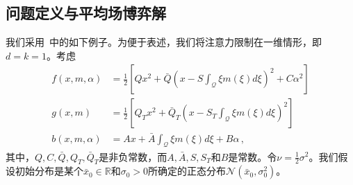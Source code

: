 \documentclass{amsproc}
\theoremstyle{definition}
\theoremstyle{remark}
\numberwithin{equation}{section}
\newcommand{\RR}{{\mathbb R}}
\newcommand{\ctrl}{\alpha}
\newcommand{\ctrldim}{k}
\newcommand{\dom}{\mathcal{Q}}
\begin{document}
\subsection{问题定义与平均场博弈解}
\label{AMS-num-sec:LQ-pb}
我们采用~\cite[Chapter 6]{MR3134900}中的如下例子。为便于表述，我们将注意力限制在一维情形，即$d=\ctrldim=1$。考虑
\begin{align*}
	f(x,m,\ctrl)	&= \frac{1}{2} \left[ Q x^2 + \bar{Q} \left(x - S \int_{\dom} \xi m(\xi) d\xi \right)^2 + C \ctrl^2 \right]
	\\
	g(x,m) 	&= \frac{1}{2} \left[ Q_T x^2 + \bar{Q}_T \left(x - S_T \int_{\dom} \xi m(\xi) d\xi \right)^2 \right]
	\\
	b(x,m,\ctrl) 	&= Ax + \bar{A} \int_{\dom} \xi m(\xi) d\xi + B\ctrl \, ,
\end{align*}
其中，$Q, C, \bar{Q}, Q_T, \bar{Q}_T$是非负常数，而$A, \bar{A}, S, S_T$和$B$是常数。令$\nu = \tfrac{1}{2} \sigma^2$。我们假设初始分布是某个$\bar{x}_0 \in \RR$和$\sigma_0>0$所确定的正态分布$\mathcal{N}(\bar x_0, \sigma_0^2)$。
\end{document}

